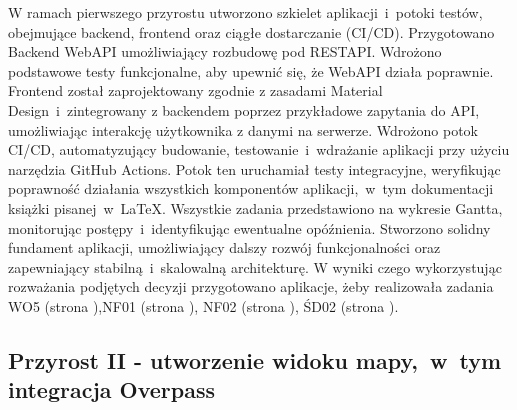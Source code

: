 W ramach pierwszego przyrostu utworzono szkielet aplikacji~i~potoki testów, obejmujące backend, frontend oraz ciągłe dostarczanie (CI/CD). \newline
\indent Przygotowano Backend WebAPI umożliwiający rozbudowę pod RESTAPI. Wdrożono podstawowe testy funkcjonalne, aby upewnić się, że WebAPI działa poprawnie.\newline
\indent Frontend został zaprojektowany zgodnie z zasadami Material Design~i~zintegrowany z backendem poprzez przykładowe zapytania do API, umożliwiając interakcję użytkownika z danymi na serwerze. \newline
\indent Wdrożono potok CI/CD, automatyzujący budowanie, testowanie~i~wdrażanie aplikacji przy użyciu narzędzia GitHub Actions. Potok ten uruchamiał testy integracyjne, weryfikując poprawność działania wszystkich komponentów aplikacji,~w~tym dokumentacji książki pisanej~w~\LaTeX. \newline
\indent Wszystkie zadania przedstawiono na wykresie Gantta, monitorując postępy~i~identyfikując ewentualne opóźnienia. Stworzono solidny fundament aplikacji, umożliwiający dalszy rozwój funkcjonalności oraz zapewniający stabilną~i~skalowalną architekturę. \newline
W wyniki czego wykorzystując rozważania podjętych decyzji przygotowano aplikacje, żeby realizowała zadania WO5 (strona \pageref{tab:requirements:general5}),NF01 (strona \pageref{tab:requirements:nonfunc1}), NF02 (strona \pageref{tab:requirements:nonfunc2}), ŚD02 (strona \pageref{tab:requirements:envfunc2}).

\subsection{Przyrost II - utworzenie widoku mapy,~w~tym integracja  Overpass}
    \label{sec:przyrost2}

